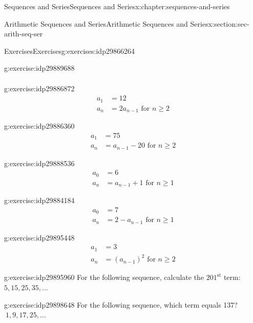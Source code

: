 \documentclass[twoside,10pt,]{book}
\numberwithin{equation}{section}
\newcommand{\upst}[1]{{#1^{\text{st}}}}
\newcommand{\amp}{&}
\begin{document}
\begin{chapterptx}{Sequences and Series}{}{Sequences and Series}{}{}{x:chapter:sequences-and-series}
\begin{sectionptx}{Arithmetic Sequences and Series}{}{Arithmetic Sequences and Series}{}{}{x:section:sec-arith-seq-ser}
\begin{exercises-subsection}{Exercises}{}{Exercises}{}{}{g:exercises:idp29866264}
\begin{exercisegroup}
\begin{divisionexerciseeg}{13}{}{}{g:exercise:idp29889688}
\begin{align*}
\end{align*}
\end{divisionexerciseeg}%
\begin{divisionexerciseeg}{14}{}{}{g:exercise:idp29886872}%
%
\begin{align*}
a_1\amp = 12\\
a_n\amp = 2a_{n-1}\text{   for }n\ge 2
\end{align*}
\end{divisionexerciseeg}%
\begin{divisionexerciseeg}{15}{}{}{g:exercise:idp29886360}%
%
\begin{align*}
a_1\amp = 75\\
a_n\amp = a_{n-1}-20\text{   for }n\ge 2
\end{align*}
\end{divisionexerciseeg}%
\begin{divisionexerciseeg}{16}{}{}{g:exercise:idp29888536}%
%
\begin{align*}
a_0\amp = 6\\
a_n\amp = a_{n-1}+1\text{   for }n\ge 1
\end{align*}
\end{divisionexerciseeg}%
\begin{divisionexerciseeg}{17}{}{}{g:exercise:idp29884184}%
%
\begin{align*}
a_0\amp = 7\\
a_n\amp = 2-a_{n-1}\text{   for }n\ge 1
\end{align*}
\end{divisionexerciseeg}%
\begin{divisionexerciseeg}{18}{}{}{g:exercise:idp29895448}%
%
\begin{align*}
a_1 \amp = 3\\
a_n\amp = \left(a_{n-1}\right)^2\text{   for }n\ge 2
\end{align*}
\end{divisionexerciseeg}%
\end{exercisegroup}
\par\medskip\noindent
\begin{divisionexercise}{19}{}{}{g:exercise:idp29895960}%
For the following sequence, calculate the \(\upst{201}\) term: \(5, 15, 25, 35, \ldots\)\end{divisionexercise}%
\begin{divisionexercise}{20}{}{}{g:exercise:idp29898648}%
For the following sequence, which term equals 137?     \(\ 1, 9, 17, 25, \ldots\)\end{divisionexercise}%

\end{exercises-subsection}
\end{sectionptx}
\end{chapterptx}
\end{document}
